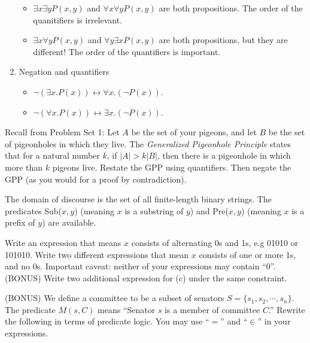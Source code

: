 \documentclass[solution, letterpaper]{cs20inclass}
\begin{document}
\begin{enumerate}
\begin{itemize}
\item $\exists x \exists y P(x,y)$ and $\forall x \forall y P(x,y)$ are both propositions. The order of the quanitifiers is irrelevant.

\item $\exists x \forall y P(x,y)$ and $\forall y \exists x P(x,y)$ are both propositions, but they are different! The order of the quantifiers is important. 

\end{itemize}

\item Negation and quantifiers
\begin{itemize}
\item $\neg (\exists x. P(x)) \leftrightarrow \forall x. (\neg P(x))$.
\item $\neg (\forall x. P(x)) \leftrightarrow \exists x. (\neg P(x))$.

\end{itemize}

\end{enumerate}

\problem Recall from Problem Set 1: Let $A$ be the set of your pigeons, and let $B$ be the set of pigeonholes in which they live. The \textit{Generalized Pigeonhole Principle} states that for a natural number $k$, if $|A| > k|B|$, then there is a pigeonhole in which more than $k$ pigeons live. Restate the GPP using quantifiers. Then negate the GPP (as you would for a proof by contradiction).

\begin{solution}
\end{solution}

\problem
 The domain of discourse is the set of all finite-length binary strings. The predicates Sub($x,y$) (meaning $x$ is a substring of $y$) and Pre($x,y$) (meaning $x$ is a prefix of $y$) are available.

\subproblem  Write an expression that means $x$ consists of alternating 0s and 1s, e.g 01010 or 101010.
\subproblem Write two different expressions that mean $x$ consists of one or more 1s, and no 0s. Important caveat: neither of your expressions may contain ``0''.
\subproblem (BONUS) Write two additional expression for (c) under the same constraint.

\begin{solution}
\end{solution}


\problem
(BONUS) We define a committee to be a subset of senators $S = \{s_1,s_2,\cdots,s_n\}$. The predicate $M(s,C)$ means ``Senator $s$ is a member of committee $C$.'' Rewrite the following in terms of predicate logic. You may use ``$=$'' and ``$\in$'' in your expressions.
\end{document}
